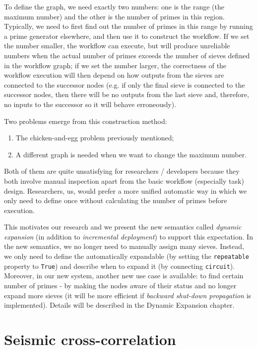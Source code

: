 To define the graph, we need exactly two numbers: one is the range (\ie the maximum number) and the other is the number of primes in this region. Typically, we need to first find out the number of primes in this range by running a prime generator elsewhere, and then use it to construct the workflow. If we set the number smaller, the workflow can execute, but will produce unreliable numbers when the actual number of primes exceeds the number of sieves defined in the workflow graph; if we set the number larger, the correctness of the workflow execution will then depend on how outputs from the sieves are connected to the successor nodes (e.g. if only the final sieve is connected to the successor nodes, then there will be no outputs from the last sieve and, therefore, no inputs to the successor so it will behave erroneously).

Two problems emerge from this construction method:
\begin{enumerate}
	\item The chicken-and-egg problem previously mentioned;
	\item A different graph is needed when we want to change the maximum number.
\end{enumerate}

Both of them are quite unsatisfying for researchers / developers because they both involve manual inspection apart from the basic workflow (especially task) design. Researchers, \eg us, would prefer a more unified automatic way in which we only need to define once without calculating the number of primes before execution.

This motivates our research and we present the new semantics called \emph{dynamic expansion} (in addition to \emph{incremental deployment}) to support this expectation. In the new semantics, we no longer need to manually assign many sieves. Instead, we only need to define the \cdSieve automatically expandable (by setting the \lstinline|repeatable| property to \lstinline|True|) and describe when to expand it (by connecting \lstinline|circuit|). Moreover, in our new system, another new use case is available: to find certain number of primes - by making the \cdSieve nodes aware of their status and no longer expand more sieves (it will be more efficient if \emph{backward shut-down propagation} is implemented). Details will be described in the Dynamic Expansion chapter. 

\section{Seismic cross-correlation}
